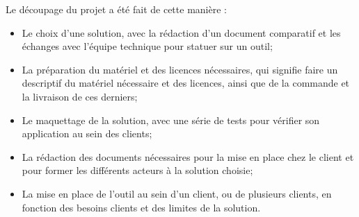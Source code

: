 \documentclass[pfe]{tnreport} %
\begin{document}
Le découpage du projet a été fait de cette manière : \newline
\begin{itemize}
 \item Le choix d'une solution, avec la rédaction d'un document comparatif et les échanges avec l'équipe technique pour statuer sur un outil;
 \item La préparation du matériel et des licences nécessaires, qui signifie faire un descriptif du matériel nécessaire et des licences, ainsi que de la commande et la livraison de ces derniers;
 \item Le maquettage de la solution, avec une série de tests pour vérifier son application au sein des clients;
 \item La rédaction des documents nécessaires pour la mise en place chez le client et pour former les différents acteurs à la solution choisie;
 \item La mise en place de l'outil au sein d'un client, ou de plusieurs clients, en fonction des besoins clients et des limites de la solution. \newline
\end{itemize}
\end{document}
